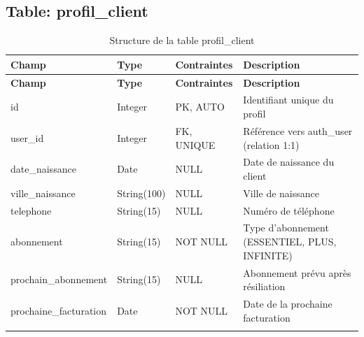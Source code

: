 \documentclass[12pt,a4paper]{report}
\begin{document}
\subsection{Table: profil\_client}
\begin{longtable}{|p{3.5cm}|p{2.5cm}|p{2cm}|p{6cm}|}
\hline
\rowcolor{banquiseblue!30}
\textbf{Champ} & \textbf{Type} & \textbf{Contraintes} & \textbf{Description} \\
\hline
\endfirsthead
\hline
\rowcolor{banquiseblue!30}
\textbf{Champ} & \textbf{Type} & \textbf{Contraintes} & \textbf{Description} \\
\hline
\endhead

id & Integer & PK, AUTO & Identifiant unique du profil \\
\hline
user\_id & Integer & FK, UNIQUE & Référence vers auth\_user (relation 1:1) \\
\hline
date\_naissance & Date & NULL & Date de naissance du client \\
\hline
ville\_naissance & String(100) & NULL & Ville de naissance \\
\hline
telephone & String(15) & NULL & Numéro de téléphone \\
\hline
abonnement & String(15) & NOT NULL & Type d'abonnement (ESSENTIEL, PLUS, INFINITE) \\
\hline
prochain\_abonnement & String(15) & NULL & Abonnement prévu après résiliation \\
\hline
prochaine\_facturation & Date & NOT NULL & Date de la prochaine facturation \\
\hline

\caption{Structure de la table profil\_client}
\end{longtable}
\end{document}

